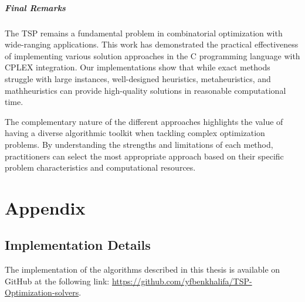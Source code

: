 \documentclass{article}
\begin{document}
\subparagraph{Final Remarks}
The TSP remains a fundamental problem in combinatorial optimization with wide-ranging applications. This work has demonstrated the practical effectiveness of 
implementing various solution approaches in the C programming language with CPLEX integration. Our implementations show that while exact methods struggle with large instances, 
well-designed heuristics, metaheuristics, and mathheuristics can provide high-quality solutions in reasonable computational time.

The complementary nature of the different approaches highlights the value of having a diverse algorithmic toolkit when tackling complex optimization problems. 
By understanding the strengths and limitations of each method, practitioners can select the most appropriate approach based on their specific problem characteristics and computational resources.

\newpage

\section{Appendix}
\subsection{Implementation Details}
The implementation of the algorithms described in this thesis is available on GitHub at the following link: \url{https://github.com/yfbenkhalifa/TSP-Optimization-solvers}.

\newpage



\end{document}
